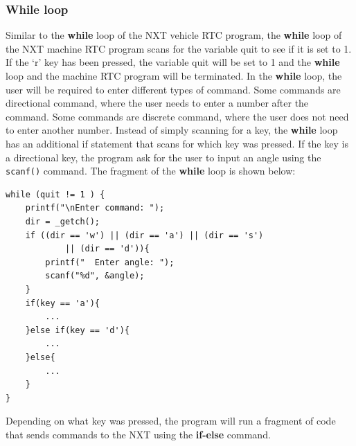 \documentclass[11pt]{article}
\begin{document}
\subsubsection*{While loop}
Similar to the {\bf while} loop of the NXT vehicle RTC program, the {\bf while} 
loop of the NXT machine RTC program scans for the variable quit to see if it is 
set to 1. If the `r' key has been pressed, the variable quit will be set to 1 
and the {\bf while} loop and the machine RTC program will be terminated. In the 
{\bf while} loop, the user will be required to enter different types of command. 
Some commands are directional command, where the user needs to enter a number 
after the command. Some commands are discrete command, where the user does not 
need to enter another number. Instead of simply scanning for a key, the {\bf while} 
loop has an additional if statement that scans for which key was pressed. If the 
key is a directional key, the program ask for the user to input an angle using 
the {\tt scanf()} command. The fragment of the {\bf while} loop is shown below:
\begin{lstlisting}
while (quit != 1 ) {
    printf("\nEnter command: ");
    dir = _getch();
    if ((dir == 'w') || (dir == 'a') || (dir == 's') 
            || (dir == 'd')){
        printf("  Enter angle: ");
        scanf("%d", &angle);
    }
    if(key == 'a'){
        ...
    }else if(key == 'd'){
        ...
    }else{
        ...
    }
}
\end{lstlisting}
Depending on what key was pressed, the program will run a fragment of code that 
sends commands to the NXT using the {\bf if-else} command.
\end{document}
